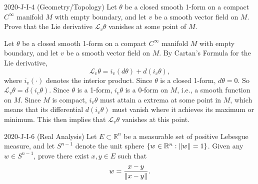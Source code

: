 \documentclass{article}
\begin{document}
\begin{prb}{2020-J-I-4 (Geometry/Topology)}
	Let $\theta$ be a closed smooth 1-form on a compact $C^{\infty}$ manifold $M$ with empty boundary, and let $v$ be a smooth vector field on $M$. Prove that the Lie derivative $\mathscr{L}_{v}\theta$ vanishes at some point of $M$. 
\end{prb}
\begin{solutions}
	Let $\theta$ be a closed smooth 1-form on a compact $C^{\infty}$ manifold $M$ with empty boundary, and let $v$ be a smooth vector field on $M$. By Cartan's Formula for the Lie derivative, 
		\begin{equation}
			\mathscr{L}_{v}\theta = i_{v}(d\theta) + d(i_{v}\theta), 
		\end{equation}
	where $i_{v}(\cdot)$ denotes the interior product. Since $\theta$ is a closed 1-form, $d\theta = 0$. So $\mathscr{L}_{v}\theta = d(i_{v}\theta)$. Since $\theta$ is a 1-form, $i_{v}\theta$ is a 0-form on $M$, i.e., a smooth function on $M$. Since $M$ is compact, $i_{v}\theta$ must attain a extrema at some point in $M$, which means that its differential $d(i_{v}\theta)$ must vanish where it achieves its maximum or minimum. This then implies that $\mathscr{L}_{v}\theta$ vanishes at this point. 
\end{solutions}
\begin{prb}{2020-J-I-6 (Real Analysis)}
	Let $E \subset \mathbb{R}^{n}$ be a measurable set of positive Lebesgue measure, and let $S^{n - 1}$ denote the unit sphere $\brac*{w \in \mathbb{R}^{n}: \norm{w} = 1}$. Given any $w \in S^{n - 1}$, prove there exist $x, y \in E$ such that $$w = \frac{x - y}{\norm{x - y}}.$$
\end{prb}
\end{document}
